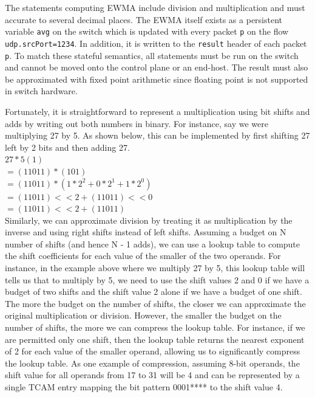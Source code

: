 \documentclass[12pt, oneside]{article}
\begin{document}
The statements computing EWMA include division and multiplication and must accurate to several decimal places. The EWMA itself exists as a persistent variable \texttt{avg} on the switch which is updated with every packet \texttt{p} on the flow \texttt{udp.srcPort=1234}. In addition, it is written to the \texttt{result} header of each packet \texttt{p}. To match these stateful semantics, all statements must be run on the switch and cannot be moved onto the control plane or an end-host. The result must also be approximated with fixed point arithmetic since floating point is not supported in switch hardware. 

Fortunately, it is straightforward to represent a multiplication using bit shifts and adds by writing out both numbers in binary. For instance, say we were multiplying 27 by 5. As shown below, this can be implemented by first shifting 27 left by 2 bits and then adding 27.\\
$27 * 5 (1)$\\
$= (11011) * (101)$\\
$= (11011) * (1 * 2^2 + 0 * 2^1 + 1 * 2^0)$\\
$= (11011) << 2 + (11011) << 0$\\
$= (11011) << 2 + (11011)$\\
Similarly, we can approximate division by treating it as multiplication by the inverse and using right shifts instead of left shifts. Assuming a budget on N number of shifts (and hence N - 1 adds), we can use a lookup table to compute the shift coefficients for each value of the smaller of the two operands. For instance, in the example above where we multiply 27 by 5, this lookup table will tells us that to multiply by 5, we need to use the shift values 2 and 0 if we have a budget of two shifts and the shift value 2 alone if we have a budget of one shift.
The more the budget on the number of shifts, the closer we can approximate the original multiplication or division. However, the smaller the budget on the number of shifts, the more we can compress the lookup table. For instance, if we are permitted only one shift, then the lookup table returns the nearest exponent of 2 for each value of the smaller operand, allowing us to significantly compress the lookup table. As one example of compression, assuming 8-bit operands, the shift value for all operands from 17 to 31 will be 4 and can be represented by a single TCAM entry mapping the bit pattern 0001**** to the shift value 4.
\end{document}
